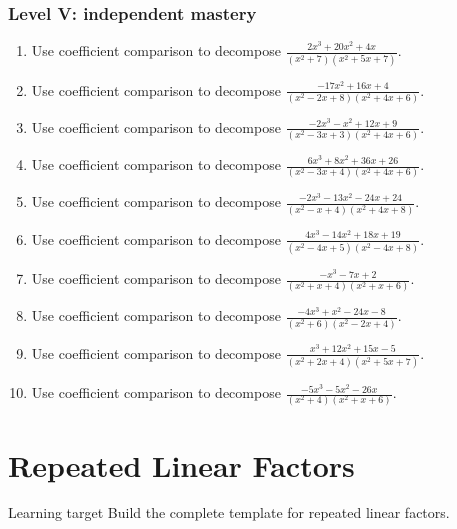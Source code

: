 \documentclass[11pt,oneside]{book}
\begin{document}
\subsection*{Level V: independent mastery}
\begin{enumerate}[leftmargin=*,label=\textbf{\arabic*.},itemsep=0.65\baselineskip]
\item Use coefficient comparison to decompose $\displaystyle \frac{2 x^{3} + 20 x^{2} + 4 x}{\left(x^{2} + 7\right) \left(x^{2} + 5 x + 7\right)}$.
\item Use coefficient comparison to decompose $\displaystyle \frac{- 17 x^{2} + 16 x + 4}{\left(x^{2} - 2 x + 8\right) \left(x^{2} + 4 x + 6\right)}$.
\item Use coefficient comparison to decompose $\displaystyle \frac{- 2 x^{3} - x^{2} + 12 x + 9}{\left(x^{2} - 3 x + 3\right) \left(x^{2} + 4 x + 6\right)}$.
\item Use coefficient comparison to decompose $\displaystyle \frac{6 x^{3} + 8 x^{2} + 36 x + 26}{\left(x^{2} - 3 x + 4\right) \left(x^{2} + 4 x + 6\right)}$.
\item Use coefficient comparison to decompose $\displaystyle \frac{- 2 x^{3} - 13 x^{2} - 24 x + 24}{\left(x^{2} - x + 4\right) \left(x^{2} + 4 x + 8\right)}$.
\item Use coefficient comparison to decompose $\displaystyle \frac{4 x^{3} - 14 x^{2} + 18 x + 19}{\left(x^{2} - 4 x + 5\right) \left(x^{2} - 4 x + 8\right)}$.
\item Use coefficient comparison to decompose $\displaystyle \frac{- x^{3} - 7 x + 2}{\left(x^{2} + x + 4\right) \left(x^{2} + x + 6\right)}$.
\item Use coefficient comparison to decompose $\displaystyle \frac{- 4 x^{3} + x^{2} - 24 x - 8}{\left(x^{2} + 6\right) \left(x^{2} - 2 x + 4\right)}$.
\item Use coefficient comparison to decompose $\displaystyle \frac{x^{3} + 12 x^{2} + 15 x - 5}{\left(x^{2} + 2 x + 4\right) \left(x^{2} + 5 x + 7\right)}$.
\item Use coefficient comparison to decompose $\displaystyle \frac{- 5 x^{3} - 5 x^{2} - 26 x}{\left(x^{2} + 4\right) \left(x^{2} + x + 6\right)}$.
\end{enumerate}
\chapter{Repeated Linear Factors}
\begin{rulebox}{Learning target}
Build the complete template for repeated linear factors.
\end{rulebox}
\end{document}
